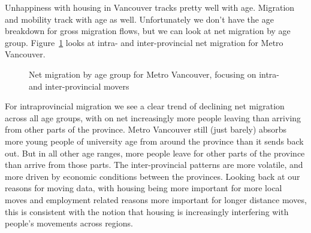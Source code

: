 \documentclass[
  letterpaper,
]{article}
\begin{document}
Unhappiness with housing in Vancouver tracks pretty well with age.
Migration and mobility track with age as well. Unfortunately we don't
have the age breakdown for gross migration flows, but we can look at net
migration by age group. Figure~\ref{fig-metro-van-net-migration-age}
looks at intra- and inter-provincial net migration for Metro Vancouver.

\begin{figure}[H]


\caption{\label{fig-metro-van-net-migration-age}Net migration by age
group for Metro Vancouver, focusing on intra- and inter-provincial
movers}

\end{figure}%

For intraprovincial migration we see a clear trend of declining net
migration across all age groups, with on net increasingly more people
leaving than arriving from other parts of the province. Metro Vancouver
still (just barely) absorbs more young people of university age from
around the province than it sends back out. But in all other age ranges,
more people leave for other parts of the province than arrive from those
parts. The inter-provincial patterns are more volatile, and more driven
by economic conditions between the provinces. Looking back at our
reasons for moving data, with housing being more important for more
local moves and employment related reasons more important for longer
distance moves, this is consistent with the notion that housing is
increasingly interfering with people's movements across regions.
\end{document}
